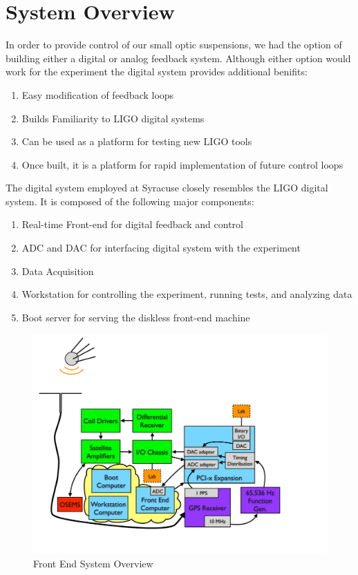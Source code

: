 
\section{System Overview}

In order to provide control of our small optic suspensions, we had the option of building either a digital or analog feedback system.
Although either option would work for the experiment the digital system provides additional benifits:

\begin{enumerate}
\item Easy modification of feedback loops
\item Builds Familiarity to LIGO digital systems
\item Can be used as a platform for testing new LIGO tools
\item Once built, it is a platform for rapid implementation of future control loops
\end{enumerate}

The digital system employed at Syracuse closely resembles the LIGO digital system. It is composed of the following major components:
\begin{enumerate}
\item Real-time Front-end for digital feedback and control
\item ADC and DAC for interfacing digital system with the experiment
\item Data Acquisition
\item Workstation for controlling the experiment, running tests, and analyzing data
\item Boot server for serving the diskless front-end machine
\end{enumerate}

\begin{figure}[htbp]
	\centering
		\includegraphics[width=15cm]{./figures/FrontEndSystem.pdf}
	\caption{{Front End System Overview}}
	\label{fig:front_end}
\end{figure}


